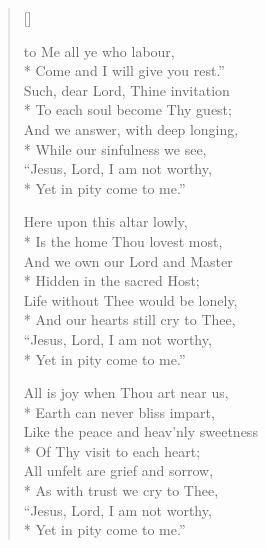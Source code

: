 \newHymn


\begin{verse}[\versewidth]
\begin{altverse}
 to Me all ye who labour, \\*
Come and I will give you rest.''\\
Such, dear Lord, Thine invitation \\*
To each soul become Thy guest;\\
And we answer, with deep longing,\\*
While our sinfulness we see,\\
``Jesus, Lord, I am not worthy,\\*
Yet in pity come to me.''
\end{altverse}

\begin{altverse}
 Here upon this altar lowly,\\*
Is the home Thou lovest most,\\
And we own our Lord and Master\\*
Hidden in the sacred Host;\\
Life without Thee would be lonely,\\*
And our hearts still cry to Thee,\\
``Jesus, Lord, I am not worthy,\\*
Yet in pity come to me.''
\end{altverse}

\begin{altverse}
 All is joy when Thou art near us,\\*
Earth can never bliss impart,\\
Like the peace and heav'nly sweetness\\*
Of Thy visit to each heart;\\
All unfelt are grief and sorrow,\\*
As with trust we cry to Thee,\\
``Jesus, Lord, I am not worthy,\\*
Yet in pity come to me.''
\end{altverse}
\end{verse}

